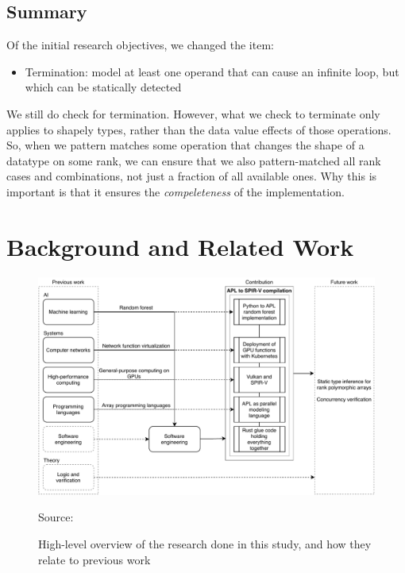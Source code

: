 \documentclass{report}
\newcommand{\source}[1]{\caption*{Source: {#1}} }
\begin{document}
\section*{Summary}

Of the initial research objectives, we changed the item:

\begin{itemize}
  \item Termination: model at least one operand that can cause an infinite loop, but which can be statically detected
\end{itemize}

We still do check for termination. However, what we check to terminate only applies to shapely types, rather than the data value effects of those operations. So, when we pattern matches some operation that changes the shape of a datatype on some rank, we can ensure that we also pattern-matched all rank cases and combinations, not just a fraction of all available ones. Why this is important is that it ensures the \emph{compeleteness} of the implementation.

\chapter{Background and Related Work}
\label{ch:bg}

\begin{figure}
  \centering
  \includegraphics[width=\columnwidth]{overview.pdf}
  \caption{High-level overview of the research done in this study, and how they relate to previous work}
  \source{\cite{gpupoly}}
  \label{fig:ov}
\end{figure}
\end{document}
